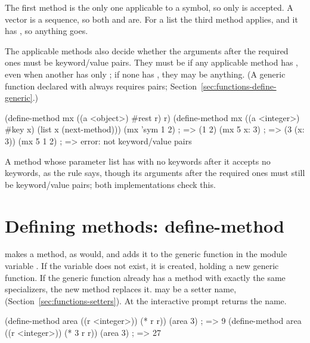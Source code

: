 \noindent The first  method is the only one applicable to a
symbol, so only  is accepted. A vector is a sequence, so both
 and  are. For a list the third method
applies, and it has , so anything goes.

The applicable methods also decide whether the arguments after the required
ones must be keyword/value pairs. They must be if any applicable method has
, even when another has only ; if none has
, they may be anything. (A generic function declared with
 always requires pairs; Section~\ref{sec:functions-define-generic}.)

\begin{dylan}
(define-method mx ((a <object>) #rest r) r)
(define-method mx ((a <integer>) #key x) (list x (next-method)))
(mx 'sym 1 2)                  ; => (1 2)
(mx 5 x: 3)                    ; => (3 (x: 3))
(mx 5 1 2)                     ; => error: not keyword/value pairs
\end{dylan}

A method whose parameter list has  with no keywords after it
accepts no keywords, as the rule says, though its arguments after the
required ones must still be keyword/value pairs; both implementations
check this.

\section{Defining methods: define-method}\label{sec:functions-define-method}

\begin{quote}
\end{quote}

\noindent {} makes a method, as  would, and
adds it to the generic function in the module variable . If the
variable does not exist, it is created, holding a new generic function. If
the generic function already has a method with exactly the same
specializers, the new method replaces it.  may be a setter name,
 (Section~\ref{sec:functions-setters}). At the
interactive prompt  returns the name.

\begin{dylan}
(define-method area ((r <integer>)) (* r r))
(area 3)                       ; => 9
(define-method area ((r <integer>)) (* 3 r r))
(area 3)                       ; => 27
\end{dylan}

